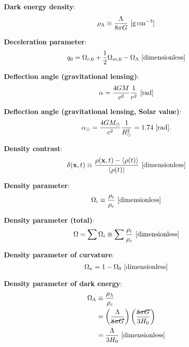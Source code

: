 \documentclass[a4paper,10pt]{article}
\begin{document}
{\noindent}\textbf{Dark energy density}:
\begin{align*}
    \rho_\Lambda \equiv \dfrac{\Lambda}{8\pi G} ~ [{\rm g\,cm^{-3}}]
\end{align*}

{\noindent}\textbf{Deceleration parameter}:
\begin{align*}
    q_0 = \Omega_{r,0} + \frac{1}{2}\Omega_{m,0} - \Omega_\Lambda ~ [{\rm dimensionless}]
\end{align*}

{\noindent}\textbf{Deflection angle (gravitational lensing)}:
\begin{align*}
    \alpha = \frac{4GM}{c^2}\frac{1}{r^2} ~ [{\rm rad}]
\end{align*}

{\noindent}\textbf{Deflection angle (gravitational lensing, Solar value)}:
\begin{align*}
    \alpha_\odot = \frac{4GM_\odot}{c^2}\frac{1}{R_\odot^2} = 1.74 ~ [{\rm rad}].
\end{align*}

{\noindent}\textbf{Density contrast}:
\begin{align*}
    \delta(\mathbf{x},t) \equiv \frac{\rho(\mathbf{x},t)-\langle\rho(t)\rangle}{\langle\rho(t)\rangle} ~ [{\rm dimensionless}]
\end{align*}

{\noindent}\textbf{Density parameter}:
\begin{align*}
    \Omega_i \equiv \frac{\rho_i}{\rho_c} ~ [{\rm dimensionless}]
\end{align*}

{\noindent}\textbf{Density parameter (total)}:
\begin{align*}
    \Omega = \sum\Omega_i \equiv \sum \frac{\rho_i}{\rho_c} ~ [{\rm dimensionless}]
\end{align*}

{\noindent}\textbf{Density parameter of curvature}:
\begin{align*}
    \Omega_\kappa = 1-\Omega_0 ~ [{\rm dimensionless}]
\end{align*}

{\noindent}\textbf{Density parameter of dark energy}:
\begin{align*}
    \Omega_\Lambda &\equiv \dfrac{\rho_\Lambda}{\rho_c} \\
    &= \left(\dfrac{\Lambda}{\cancel{8\pi G}}\right) \left(\dfrac{\cancel{8\pi G}}{3H_0}\right) \\
    &= \dfrac{\Lambda}{3H_0} ~ [{\rm dimensionless}]
\end{align*}
\end{document}
